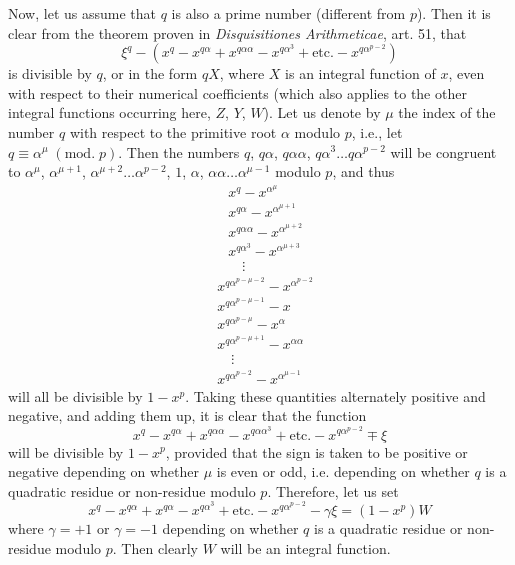 \documentclass[twoside,12pt]{memoir}
\renewcommand{\pmod}[1]{\;(\textrm{mod.}\;#1)}
\begin{document}
Now, let us assume that \(q\) is also a prime number (different from \(p\)).  Then it is clear from the theorem proven in  \textit{Disquisitiones Arithmeticae}, art. 51, that
\[\xi^{q}-(x^{q}-x^{q \alpha}+x^{q \alpha \alpha}-x^{q \alpha^{3}}+\text{etc{.}}-x^{q \alpha^{p-2}})\]
is divisible by \(q\), or in the form \(qX\), where \(X\) is an integral function of \(x\), even with respect to their numerical coefficients (which also applies to the other integral functions occurring here, \(Z\), \(Y\), \(W\)). Let us denote by \(\mu\) the index of the number \(q\) with respect to the primitive root \(\alpha\) modulo \(p\), i{.}e{.}, let \(q \equiv \alpha^{\mu}\pmod{p}\). Then the numbers \(q\), \(q \alpha\), \(q \alpha \alpha\), \(q \alpha^{3}\ldots q \alpha^{p-2}\) will be congruent to \(\alpha^{\mu}\), \(\alpha^{\mu+1}\), \(\alpha^{\mu+2}\ldots \alpha^{p-2}\), \(1\), \(\alpha\), \(\alpha \alpha\ldots \alpha^{\mu-1}\) modulo \(p\), and thus
\[\begin{aligned}
&x^{q}-x^{\alpha^{\mu}} \\
&x^{q \alpha}-x^{\alpha^{\mu+1}} \\
&x^{q \alpha \alpha}-x^{\alpha^{\mu+2}} \\
&x^{q \alpha^{3}}-x^{\alpha^{\mu+3}}\\
&\quad \vdots \end{aligned}\]\pagebreak%
\[\begin{aligned}
&x^{q \alpha^{p-\mu-2}}-x^{\alpha^{p-2}}\\
&x^{q \alpha^{p-\mu-1}}-x\\
&x^{q \alpha^{p-\mu}}-x^{\alpha}\\
&x^{q \alpha^{p-\mu+1}}-x^{\alpha \alpha}\\
&\quad \vdots\\
&x^{q\alpha^{p-2}}-x^{\alpha^{\mu-1}}
\end{aligned}\]
will all be divisible by \(1-x^{p}\). Taking these quantities alternately positive and negative, and adding them up, it is clear that the function
\[x^{q}-x^{q \alpha}+x^{q \alpha \alpha}-x^{q \alpha \alpha^{3}}+\text{etc{.}}-x^{q \alpha^{p-2}}\mp \xi\]
will be divisible by \(1-x^{p}\), provided that the sign is taken to be positive or negative depending on whether \(\mu\) is even or odd, i.e{.} depending on whether \(q\) is a quadratic residue or non-residue modulo \(p\). Therefore, let us set
\[x^{q}-x^{q \alpha}+x^{q \alpha}-x^{q \alpha^{3}}+\text{etc{.}}-x^{q \alpha^{p-2}}-\gamma \xi=(1-x^{p})W\]
where \(\gamma=+1\) or \(\gamma=-1\) depending on whether \(q\) is a quadratic residue or non-residue modulo \(p\).  Then clearly \(W\) will be an integral function.
\end{document}
